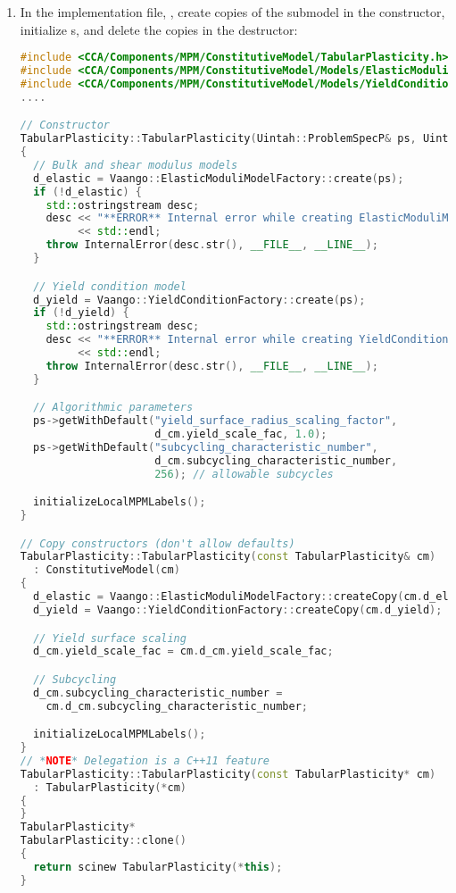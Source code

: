\begin{enumerate}
  \item In the implementation file, , create copies of the
        submodel in the constructor, initialize s, and delete the copies 
        in the destructor:
\begin{lstlisting}[language=Cpp]
#include <CCA/Components/MPM/ConstitutiveModel/TabularPlasticity.h>
#include <CCA/Components/MPM/ConstitutiveModel/Models/ElasticModuliModelFactory.h>
#include <CCA/Components/MPM/ConstitutiveModel/Models/YieldConditionFactory.h>
....

// Constructor
TabularPlasticity::TabularPlasticity(Uintah::ProblemSpecP& ps, Uintah::MPMFlags* mpmFlags) : Uintah::ConstitutiveModel(mpmFlags)
{
  // Bulk and shear modulus models
  d_elastic = Vaango::ElasticModuliModelFactory::create(ps);
  if (!d_elastic) {
    std::ostringstream desc;
    desc << "**ERROR** Internal error while creating ElasticModuliModel."
         << std::endl;
    throw InternalError(desc.str(), __FILE__, __LINE__);
  }

  // Yield condition model
  d_yield = Vaango::YieldConditionFactory::create(ps);
  if (!d_yield) {
    std::ostringstream desc;
    desc << "**ERROR** Internal error while creating YieldConditionModel."
         << std::endl;
    throw InternalError(desc.str(), __FILE__, __LINE__);
  }

  // Algorithmic parameters
  ps->getWithDefault("yield_surface_radius_scaling_factor",
                     d_cm.yield_scale_fac, 1.0);
  ps->getWithDefault("subcycling_characteristic_number",
                     d_cm.subcycling_characteristic_number,
                     256); // allowable subcycles

  initializeLocalMPMLabels();
}

// Copy constructors (don't allow defaults)
TabularPlasticity::TabularPlasticity(const TabularPlasticity& cm)
  : ConstitutiveModel(cm)
{
  d_elastic = Vaango::ElasticModuliModelFactory::createCopy(cm.d_elastic);
  d_yield = Vaango::YieldConditionFactory::createCopy(cm.d_yield);

  // Yield surface scaling
  d_cm.yield_scale_fac = cm.d_cm.yield_scale_fac;

  // Subcycling
  d_cm.subcycling_characteristic_number =
    cm.d_cm.subcycling_characteristic_number;

  initializeLocalMPMLabels();
}
// *NOTE* Delegation is a C++11 feature
TabularPlasticity::TabularPlasticity(const TabularPlasticity* cm)
  : TabularPlasticity(*cm)
{
}
TabularPlasticity*
TabularPlasticity::clone()
{
  return scinew TabularPlasticity(*this);
}


\end{lstlisting}
\end{enumerate}
